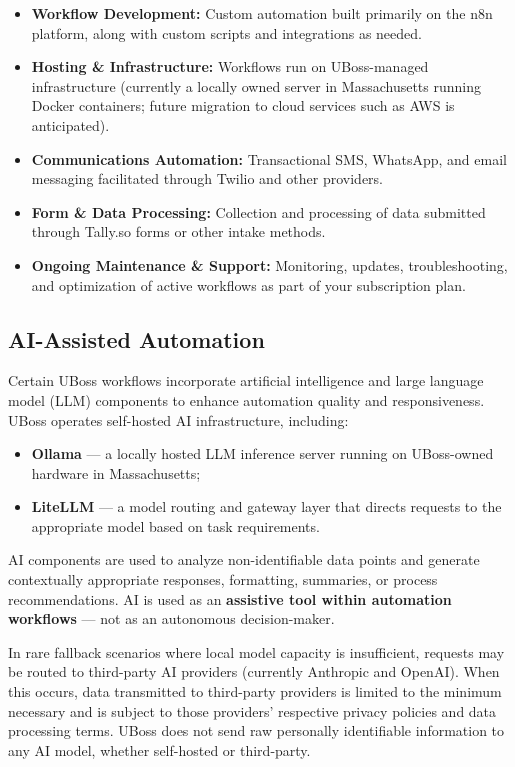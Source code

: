\documentclass[11pt,letterpaper,parskip=half]{scrartcl}
\begin{document}
\begin{itemize}[nosep, leftmargin=1.5em]
    \item \textbf{Workflow Development:} Custom automation built primarily on the n8n platform, along with custom scripts and integrations as needed.
    \item \textbf{Hosting \& Infrastructure:} Workflows run on UBoss-managed infrastructure (currently a locally owned server in Massachusetts running Docker containers; future migration to cloud services such as AWS is anticipated).
    \item \textbf{Communications Automation:} Transactional SMS, WhatsApp, and email messaging facilitated through Twilio and other providers.
    \item \textbf{Form \& Data Processing:} Collection and processing of data submitted through Tally.so forms or other intake methods.
    \item \textbf{Ongoing Maintenance \& Support:} Monitoring, updates, troubleshooting, and optimization of active workflows as part of your subscription plan.
\end{itemize}

\subsection{AI-Assisted Automation}

Certain UBoss workflows incorporate artificial intelligence and large language model (LLM) components to enhance automation quality and responsiveness. UBoss operates self-hosted AI infrastructure, including:

\begin{itemize}[nosep, leftmargin=1.5em]
    \item \textbf{Ollama} --- a locally hosted LLM inference server running on UBoss-owned hardware in Massachusetts;
    \item \textbf{LiteLLM} --- a model routing and gateway layer that directs requests to the appropriate model based on task requirements.
\end{itemize}

AI components are used to analyze non-identifiable data points and generate contextually appropriate responses, formatting, summaries, or process recommendations. AI is used as an \textbf{assistive tool within automation workflows} --- not as an autonomous decision-maker.

In rare fallback scenarios where local model capacity is insufficient, requests may be routed to third-party AI providers (currently Anthropic and OpenAI). When this occurs, data transmitted to third-party providers is limited to the minimum necessary and is subject to those providers' respective privacy policies and data processing terms. UBoss does not send raw personally identifiable information to any AI model, whether self-hosted or third-party.
\end{document}
